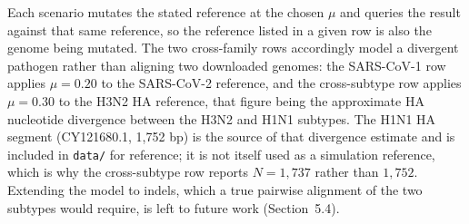 \documentclass[12pt]{article}
\theoremstyle{definition}
\theoremstyle{plain}
\begin{document}
Each scenario mutates the stated reference at the chosen $\mu$ and queries
the result against that same reference, so the reference listed in a given
row is also the genome being mutated. The two cross-family rows accordingly
model a divergent pathogen rather than aligning two downloaded genomes: the
SARS-CoV-1 row applies $\mu=0.20$ to the SARS-CoV-2 reference, and the
cross-subtype row applies $\mu=0.30$ to the H3N2 HA reference, that figure
being the approximate HA nucleotide divergence between the H3N2 and H1N1
subtypes. The H1N1 HA segment (CY121680.1, 1,752 bp) is the source of that
divergence estimate and is included in \texttt{data/} for reference; it is
not itself used as a simulation reference, which is why the cross-subtype
row reports $N=1{,}737$ rather than $1{,}752$. Extending the model to
indels, which a true pairwise alignment of the two subtypes would require,
is left to future work (Section~5.4).
\end{document}
